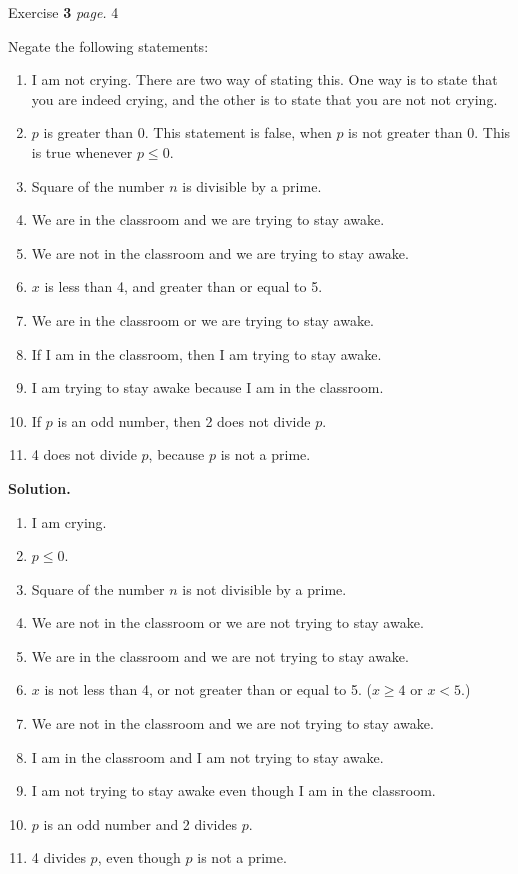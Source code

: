 \documentclass[11pt]{article}
\newcommand{\problem
}[2]{
\begin{mdframed}
    Exercise \textbf{#1} \hfill \emph{page. }#2
\end{mdframed}
}
\begin{document}
\problem{3}{4}
Negate the following statements:
\begin{enumerate}
	\item I am not crying. There are two way of stating this. One way is to state that you are indeed crying, and the other is to state that you are not not crying.
	\item $p$ is greater than 0. This statement is false, when $p$ is not greater than 0. This is true whenever $p \leq 0$.
	\item Square of the number $n$ is divisible by a prime.
	\item We are in the classroom and we are trying to stay awake.
	\item  We are not in the classroom and we are trying to stay awake.
	\item $x$ is less than 4, and greater than or equal to 5.
	\item We are in the classroom or we are trying to stay awake.
	\item If I am in the classroom, then I am trying to stay awake.
	\item I am trying to stay awake because I am in the classroom.
	\item If $p$ is an odd number, then 2 does not divide $p$.
	\item 4 does not divide $p$, because $p$ is not a prime.
\end{enumerate}
\textbf{Solution. }
\begin{enumerate}
	\item I am crying.
	\item $p \leq 0$.
	\item Square of the number $n$ is not divisible by a prime.
	\item We are not in the classroom or we are not trying to stay awake.
	\item We are in the classroom and we are not trying to stay awake.
	\item $x$ is not less than 4, or not greater than or equal to 5. ($x \geq 4$ or $x < 5$.)
	\item We are not in the classroom and we are not trying to stay awake.
	\item I am in the classroom and I am not trying to stay awake.
	\item I am not trying to stay awake even though I am in the classroom.
	\item $p$ is an odd number and 2 divides $p$.
	\item 4 divides $p$, even though $p$ is not a prime.
\end{enumerate}
\end{document}

